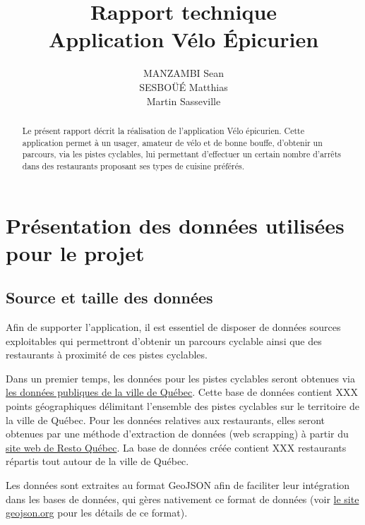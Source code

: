 \documentclass[11pt,a4paper]{article}
\begin{document}
\title{Rapport technique \\ Application Vélo Épicurien}
\author{MANZAMBI Sean \\ SESBOÜÉ Matthias \\ Martin Sasseville}

\maketitle

\begin{abstract}
    Le présent rapport décrit la réalisation de l'application Vélo épicurien. Cette application permet à un usager, amateur de vélo et de bonne bouffe, d'obtenir un parcours, via les pistes cyclables, lui permettant d'effectuer un certain nombre d'arrêts dans des restaurants proposant ses types de cuisine préférés.
\end{abstract}

\section{Présentation des données utilisées pour le projet}

\subsection{Source et taille des données}

    Afin de supporter l'application, il est essentiel de disposer de données sources exploitables qui permettront d'obtenir un parcours cyclable ainsi que des restaurants à proximité de ces pistes cyclables. 
    
    Dans un premier temps, les données pour les pistes cyclables seront obtenues via \href{https://www.donneesquebec.ca/recherche/fr/dataset/vque_24}{les données publiques de la ville de Québec}. Cette base de données contient XXX points géographiques délimitant l'ensemble des pistes cyclables sur le territoire de la ville de Québec. Pour les données relatives aux restaurants, elles seront obtenues par une méthode d'extraction de données (web scrapping) à partir du \href{https://www.restoquebec.ca/}{site web de Resto Québec}. La base de données créée contient XXX restaurants répartis tout autour de la ville de Québec.

    Les données sont extraites au format GeoJSON afin de faciliter leur intégration dans les bases de données, qui gères nativement ce format de données (voir \href{https://geojson.org/}{le site geojson.org} pour les détails de ce format).
\end{document}
